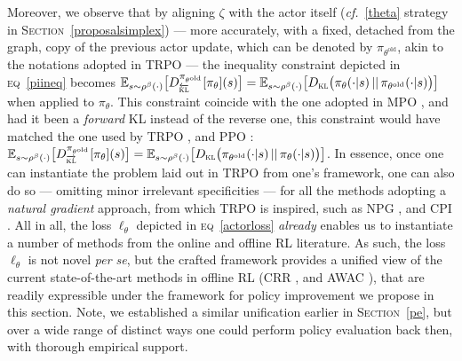 Moreover, we observe that by aligning $\zeta$ with the actor itself
(\textit{cf.}~\ref{theta} strategy in \textsc{Section}~\ref{proposalsimplex})
--- more accurately, with a fixed, detached from the graph, copy of the previous actor update,
which can be denoted by $\pi_{\theta^\text{old}}$, akin to the notations adopted in TRPO \cite{Schulman2015-jt}
--- the inequality constraint depicted in \textsc{eq}~\ref{piineq} becomes
$\mathbb{E}_{s \sim \rho^\beta(\cdot)}\big[
D^{\pi_{\theta^\text{old}}}_{\overleftarrow{\textsc{kl}}}[\pi_\theta](s)\big]
= \mathbb{E}_{s \sim \rho^\beta(\cdot)}\big[
D_{\textsc{kl}}\big(\pi_\theta (\cdot | s) \, || \, \pi_{\theta^\text{old}} (\cdot | s)\big)\big]$
when applied to $\pi_\theta$.
This constraint coincide with the one adopted in MPO \cite{Abdolmaleki2018-sp},
and had it been a \textit{forward} KL instead of the reverse one,
this constraint would have matched the one used by
TRPO \cite{Schulman2015-jt},
and PPO \cite{Schulman2017-ou}:
$\mathbb{E}_{s \sim \rho^\beta(\cdot)}\big[
D^{\pi_{\theta^\text{old}}}_{\overrightarrow{\textsc{kl}}}[\pi_\theta](s)\big]
= \mathbb{E}_{s \sim \rho^\beta(\cdot)}\big[
D_{\textsc{kl}}\big(\pi_{\theta^\text{old}} (\cdot | s) \, || \, \pi_\theta (\cdot | s)\big)\big]$.
In essence, once one can instantiate the problem laid out in TRPO from one's framework, one can also do so
--- omitting minor irrelevant specificities --- for all the methods adopting a \textit{natural gradient}
\cite{Amari2016-hl, Kakade2001-hw, Peters2008-mw}
approach, from which TRPO is inspired, such as
NPG \cite{Kakade2001-hw}, and
CPI \cite{Kakade2002-kw}.
All in all, the loss $\ell_\theta$ depicted in \textsc{eq}~\ref{actorloss} \textit{already} enables
us to instantiate a number of methods from the online and offline RL literature.
As such, the loss $\ell_\theta$ is not novel \emph{per se}, but the crafted framework
provides a unified view of the current state-of-the-art methods in offline RL
(CRR \cite{Wang2020-sr},
and AWAC \cite{Nair2020-gd}),
that are readily expressible under the framework for policy improvement we propose in this section.
Note, we established a similar unification earlier in \textsc{Section}~\ref{pe},
but over a wide range of distinct ways one could perform policy evaluation back then,
with thorough empirical support.

